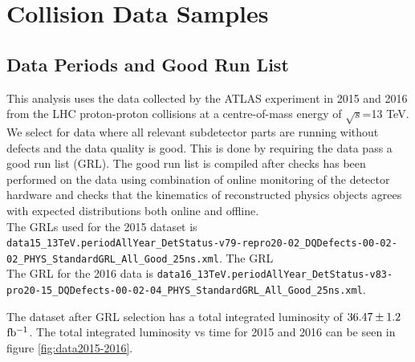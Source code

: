 \chapter{Collision Data Samples}
\label{chap:data}
\section{Data Periods and Good Run List}
\label{EventSel:GRL}

\indent This analysis uses the data collected by the ATLAS experiment in 2015 and 2016 from the LHC proton-proton collisions at a centre-of-mass energy of $\sqrt{s}$=13 TeV. \\

\indent We select for data where all relevant subdetector parts are running without defects and the data quality is good.  This is done by requiring the data pass a good run list (GRL).  The good run list is compiled after checks has been performed on the data using combination of online monitoring of the detector hardware and checks that the kinematics of reconstructed physics objects agrees with expected distributions both online and offline.  \\

\indent The GRLs used for the 2015 dataset is {\tt \scriptsize data15\_13TeV.periodAllYear\_DetStatus-v79-repro20-02\_DQDefects-00-02-02\_PHYS\_StandardGRL\_All\_Good\_25ns.xml}.  The GRL\\
The GRL for the 2016 data is {\tt \scriptsize data16\_13TeV.periodAllYear\_DetStatus-v83-pro20-15\_DQDefects-00-02-04\_PHYS\_StandardGRL\_All\_Good\_25ns.xml}.

\indent The dataset after GRL selection has a total integrated luminosity of $36.47 \pm 1.2$ $\mbox{fb$^{-1}$}$.  The total integrated luminosity vs time for 2015 and 2016 can be seen in figure \ref{fig:data2015-2016}.\\

